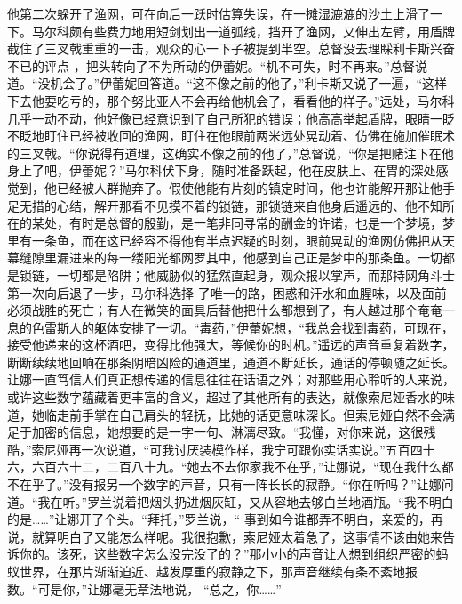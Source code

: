 \documentclass{article}
\begin{document}
他第二次躲开了渔网，可在向后一跃时估算失误，在一摊湿漉漉的沙土上滑了一下。马尔科颇有些费力地用短剑划出一道弧线，挡开了渔网，又伸出左臂，用盾牌截住了三叉戟重重的一击，观众的心一下子被提到半空。总督没去理睬利卡斯兴奋不已的评点
\newpage
，把头转向了不为所动的伊蕾妮。“机不可失，时不再来。”总督说道。“没机会了。”伊蕾妮回答道。“这不像之前的他了，”利卡斯又说了一遍，“这样下去他要吃亏的，那个努比亚人不会再给他机会了，看看他的样子。”远处，马尔科几乎一动不动，他好像已经意识到了自己所犯的错误；他高高举起盾牌，眼睛一眨不眨地盯住已经被收回的渔网，盯住在他眼前两米远处晃动着、仿佛在施加催眠术的三叉戟。“你说得有道理，这确实不像之前的他了，”总督说，“你是把赌注下在他身上了吧，伊蕾妮？”马尔科伏下身，随时准备跃起，他在皮肤上、在胃的深处感觉到，他已经被人群抛弃了。假使他能有片刻的镇定时间，他也许能解开那让他手足无措的心结，解开那看不见摸不着的锁链，那锁链来自他身后遥远的、他不知所在的某处，有时是总督的殷勤，是一笔非同寻常的酬金的许诺，也是一个梦境，梦里有一条鱼，而在这已经容不得他有半点迟疑的时刻，眼前晃动的渔网仿佛把从天幕缝隙里漏进来的每一缕阳光都网罗其中，他感到自己正是梦中的那条鱼。一切都是锁链，一切都是陷阱；他威胁似的猛然直起身，观众报以掌声，而那持网角斗士第一次向后退了一步，马尔科选择
\newpage
了唯一的路，困惑和汗水和血腥味，以及面前必须战胜的死亡；有人在微笑的面具后替他把什么都想到了，有人越过那个奄奄一息的色雷斯人的躯体安排了一切。“毒药，”伊蕾妮想，“我总会找到毒药，可现在，接受他递来的这杯酒吧，变得比他强大，等候你的时机。”遥远的声音重复着数字，断断续续地回响在那条阴暗凶险的通道里，通道不断延长，通话的停顿随之延长。让娜一直笃信人们真正想传递的信息往往在话语之外；对那些用心聆听的人来说，或许这些数字蕴藏着更丰富的含义，超过了其他所有的表达，就像索尼娅香水的味道，她临走前手掌在自己肩头的轻抚，比她的话更意味深长。但索尼娅自然不会满足于加密的信息，她想要的是一字一句、淋漓尽致。“我懂，对你来说，这很残酷，”索尼娅再一次说道，“可我讨厌装模作样，我宁可跟你实话实说。”五百四十六，六百六十二，二百八十九。“她去不去你家我不在乎，”让娜说，“现在我什么都不在乎了。”没有报另一个数字的声音，只有一阵长长的寂静。“你在听吗？”让娜问道。“我在听。”罗兰说着把烟头扔进烟灰缸，又从容地去够白兰地酒瓶。“我不明白的是……”让娜开了个头。“拜托，”罗兰说，“
\newpage
事到如今谁都弄不明白，亲爱的，再说，就算明白了又能怎么样呢。我很抱歉，索尼娅太着急了，这事情不该由她来告诉你的。该死，这些数字怎么没完没了的？”那小小的声音让人想到组织严密的蚂蚁世界，在那片渐渐迫近、越发厚重的寂静之下，那声音继续有条不紊地报数。“可是你，”让娜毫无章法地说，
“总之，你……” 
\end{document}
